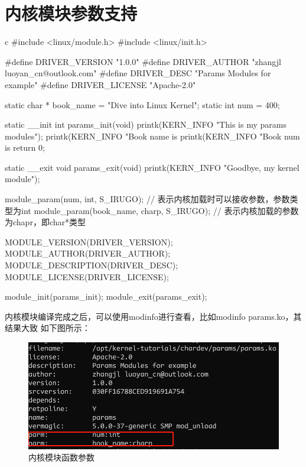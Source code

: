 \section{内核模块参数支持}
\begin{code-block}{c}
#include <linux/module.h>
#include <linux/init.h>

#define DRIVER_VERSION  "1.0.0"
#define DRIVER_AUTHOR   "zhangjl luoyan_cn@outlook.com"
#define DRIVER_DESC     "Params Modules for example"
#define DRIVER_LICENSE  "Apache-2.0"

static char * book_name = "Dive into Linux Kernel";
static int num = 400;

static __init int params_init(void)
{
        printk(KERN_INFO "This is my params modules\n");
        printk(KERN_INFO "Book name is %
        printk(KERN_INFO "Book num is %
        return 0;
}

static __exit void params_exit(void)
{
        printk(KERN_INFO "Goodbye, my kernel module\n");
}

module_param(num, int, S_IRUGO); // 表示内核加载时可以接收参数，参数类型为int
module_param(book_name, charp, S_IRUGO); // 表示内核加载的参数为chapr，即char*类型

MODULE_VERSION(DRIVER_VERSION);
MODULE_AUTHOR(DRIVER_AUTHOR);
MODULE_DESCRIPTION(DRIVER_DESC);
MODULE_LICENSE(DRIVER_LICENSE);

module_init(params_init);
module_exit(params_exit);
\end{code-block}

内核模块编译完成之后，可以使用modinfo进行查看，比如modinfo params.ko，其结果大致
如下图所示：
\begin{figure}[H]
  \centering
  \includegraphics[width=\linewidth]{params.png}
  \caption{内核模块函数参数}
  \label{fig:params}
\end{figure}

